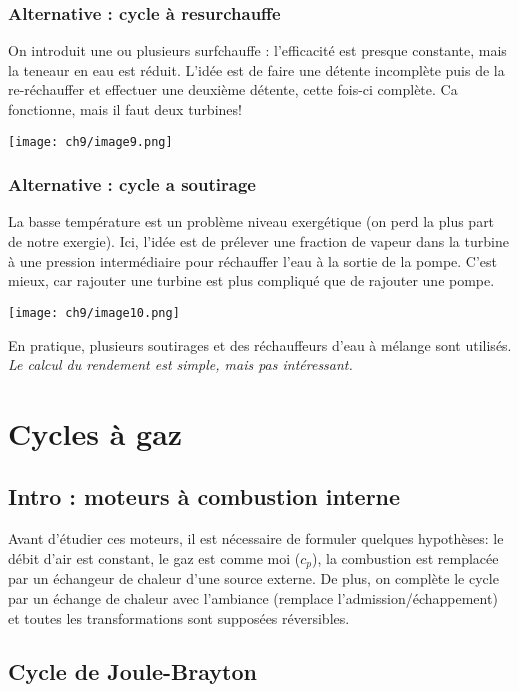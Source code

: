 		\subsubsection{Alternative : cycle à resurchauffe}
		On introduit une ou plusieurs surfchauffe : l'efficacité est presque 
		constante, mais la teneaur en eau est réduit. L'idée est de faire une 
		détente incomplète puis de la re-réchauffer et effectuer une deuxième 
		détente, cette fois-ci complète. Ca fonctionne, mais il faut deux 
		turbines!
		\begin{center}
				\texttt{[image: ch9/image9.png]}
		\end{center}
	
		\subsubsection{Alternative : cycle a soutirage}
		La basse température est un problème niveau exergétique (on perd la plus 
		part de notre exergie). Ici, l'idée est de prélever une fraction de vapeur 
		dans la turbine à une pression intermédiaire pour réchauffer l'eau à la sortie 
		de la pompe. C'est mieux, car rajouter une turbine est plus compliqué 
		que de rajouter une pompe.
				\begin{center}
				\texttt{[image: ch9/image10.png]}
		\end{center}
		En pratique, plusieurs soutirages et des réchauffeurs d’eau à mélange
		sont utilisés. \textit{Le calcul du rendement est simple, mais pas intéressant.}
		
		
\newpage
\section{Cycles à gaz}
	\subsection{Intro : moteurs à combustion interne}
	Avant d'étudier ces moteurs, il est nécessaire de formuler quelques hypothèses: le 
	débit d'air est constant, le gaz est comme moi ($c_p$), la combustion est remplacée 
	par un échangeur de chaleur d'une source externe. De plus, on complète le cycle par 
	un échange de chaleur avec l'ambiance (remplace l'admission/échappement) et toutes 
	les transformations sont supposées réversibles.
	
	\subsection{Cycle de Joule-Brayton}
